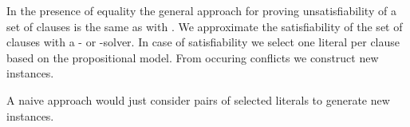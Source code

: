 In the presence of equality the general approach
for proving unsatisfiability of a set of clauses
is the same as with \InstGen{}.
We approximate the satisfiability of the set of clauses with a \SAT{}- or \SMT{}-solver.
In case of satisfiability we select one literal per clause based on the propositional model.
From occuring conflicts we construct new instances.



%

A naive approach would just consider pairs of selected literals to generate new instances.

